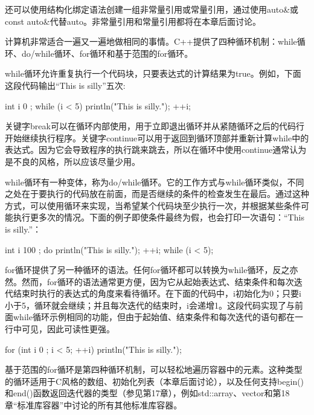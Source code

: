 还可以使用结构化绑定语法创建一组非常量引用或常量引用，通过使用auto\&或 const auto\&代替auto。非常量引用和常量引用都将在本章后面讨论。


计算机非常适合一遍又一遍地做相同的事情。C++提供了四种循环机制：while循环、do/while循环、for循环和基于范围的for循环。


while循环允许重复执行一个代码块，只要表达式的计算结果为true。例如，下面这段代码输出“This is silly”五次:

\begin{cpp}
int i { 0 };
while (i < 5) {
    println("This is silly.");
    ++i;
}
\end{cpp}

关键字break可以在循环内部使用，用于立即退出循环并从紧随循环之后的代码行开始继续执行程序。关键字continue可以用于返回到循环顶部并重新计算while中的表达式。因为它会导致程序的执行跳来跳去，所以在循环中使用continue通常认为是不良的风格，所以应该尽量少用。


while循环有一种变体，称为do/while循环。它的工作方式与while循环类似，不同之处在于要执行的代码放在前面，而是否继续的条件的检查发生在最后。通过这种方式，可以使用循环来实现，当希望某个代码块至少执行一次，并根据某些条件可能执行更多次的情况。下面的例子即使条件最终为假，也会打印一次语句：“This is silly.”：

\begin{cpp}
int i { 100 };
do {
    println("This is silly.");
    ++i;
} while (i < 5);
\end{cpp}


for循环提供了另一种循环的语法。任何for循环都可以转换为while循环，反之亦然。然而，for循环的语法通常更方便，因为它从起始表达式、结束条件和每次迭代结束时执行的表达式的角度来看待循环。在下面的代码中，i初始化为0；只要i小于5，循环就会继续；并且每次迭代的结束时，i会递增1。这段代码实现了与前面while循环示例相同的功能，但由于起始值、结束条件和每次迭代的语句都在一行中可见，因此可读性更强。

\begin{cpp}
for (int i { 0 }; i < 5; ++i) {
    println("This is silly.");
}
\end{cpp}


基于范围的for循环是第四种循环机制，可以轻松地遍历容器中的元素。这种类型的循环适用于C风格的数组、初始化列表（本章后面讨论），以及任何支持begin()和end()函数返回迭代器的类型（参见第17章），例如std::array、vector和第18章“标准库容器”中讨论的所有其他标准库容器。


